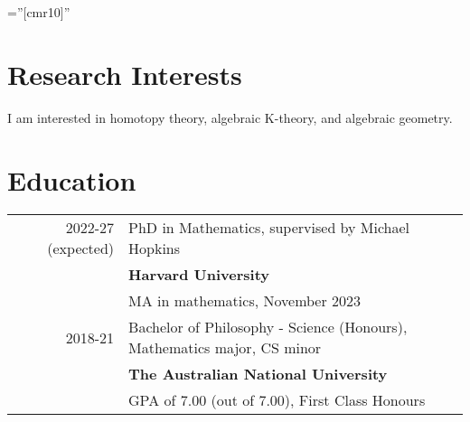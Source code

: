 \documentclass[a4paper,11pt]{article} %
\begin{document}
\pagestyle{empty} %

\font\fb=''[cmr10]'' %


\par{\par} %
\par{\par}


\section{Research Interests}

I am interested in homotopy theory, algebraic K-theory, and algebraic geometry.


\section{Education}

\begin{tabular}{rl}	
2022-27 (expected) & PhD in Mathematics, supervised by Michael Hopkins\\
& \normalsize\textbf{Harvard University}\\
& MA in mathematics, November 2023\\

2018-21 &  Bachelor of Philosophy - Science (Honours), Mathematics major, CS minor\\
& \normalsize\textbf{The Australian National University}\\
& GPA of 7.00 (out of 7.00), First Class Honours\\

\end{tabular}
\end{document}
